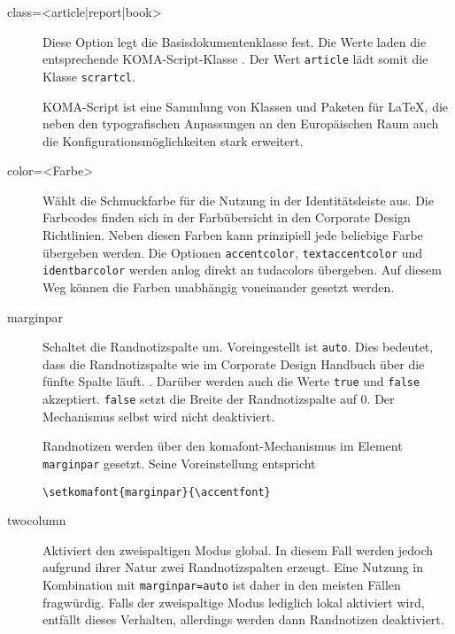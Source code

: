 \documentclass[
	german,%
	accentcolor=9c,%
]{tudapub}
\newcommand*{\code}[1]{\texttt{#1}}
\newcommand*{\pkg}[1]{\textsf{#1}}
\begin{document}
\begin{description}
	\item[class=<article|report|book>] Diese Option legt die Basisdokumentenklasse fest. Die Werte laden die entsprechende KOMA-Script-Klasse \cite{scrguide}. Der Wert \code{article} lädt somit die Klasse \code{scrartcl}.

	      KOMA-Script ist eine Sammlung von Klassen und Paketen für \LaTeX, die neben den typografischen Anpassungen an den Europäischen Raum auch die Konfigurationsmöglichkeiten stark erweitert.

	\item[color=<Farbe>] Wählt die Schmuckfarbe für die Nutzung in der Identitätsleiste aus. Die Farbcodes finden sich in der Farbübersicht in den Corporate Design Richtlinien. Neben diesen Farben kann prinzipiell jede beliebige Farbe übergeben werden. Die Optionen \code{accentcolor}, \code{textaccentcolor} und \code{identbarcolor} werden anlog direkt an \pkg{tudacolors} übergeben. Auf diesem Weg können die Farben unabhängig voneinander gesetzt werden.

	\item[marginpar] Schaltet die Randnotizspalte um. Voreingestellt ist \code{auto}. Dies bedeutet, dass die Randnotizspalte wie im Corporate Design Handbuch \cite{TUDaGuideline} über die fünfte Spalte läuft.  .
	      Darüber werden auch die Werte \code{true} und \code{false} akzeptiert. \code{false} setzt die Breite der Randnotizspalte auf 0. Der Mechanismus selbst wird nicht deaktiviert.

	      Randnotizen werden über den komafont-Mechanismus \cite[vgl.][]{scrguide} im Element \code{marginpar} gesetzt.
	      Seine Voreinstellung entspricht
\begin{verbatim}
\setkomafont{marginpar}{\accentfont}
\end{verbatim}

	\item[twocolumn] Aktiviert den zweispaltigen Modus global. In diesem Fall werden jedoch aufgrund ihrer Natur zwei Randnotizspalten erzeugt. Eine Nutzung in Kombination mit \code{marginpar=auto} ist daher in den meisten Fällen fragwürdig. Falls der zweispaltige Modus lediglich lokal aktiviert wird, entfällt dieses Verhalten, allerdings werden dann Randnotizen deaktiviert.


\end{description}
\end{document}
